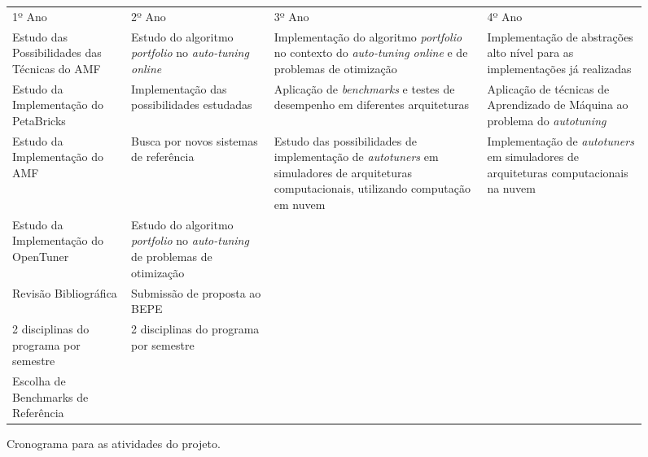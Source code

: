 \documentclass[a4paper, 12pt]{article}
\begin{document}
\begin{figure}[H]
    \centering
\begin{center}
    \begin{tabular}{ | >{\centering\arraybackslash}p{3.25cm} |
    >{\centering\arraybackslash}p{3.25cm} |
    >{\centering\arraybackslash}p{3.25cm} |
    >{\centering\arraybackslash}p{3.25cm} |}
    \multicolumn{4}{c}{} \\
    \hline
    1º Ano & 2º Ano & 3º Ano & 4º Ano \\ \hline
    \cellcolor{gray!96} Estudo das Possibilidades das Técnicas do AMF  & \cellcolor{gray!14} Estudo do algoritmo \emph{portfolio} no \emph{auto-tuning online} & \cellcolor{gray!96} Implementação do algoritmo \emph{portfolio} no contexto do \emph{auto-tuning online} e de problemas de otimização & \cellcolor{gray!14} Implementação de abstrações alto nível para as implementações já realizadas \\
    \cellcolor{gray!84} Estudo da Implementação do PetaBricks & \cellcolor{gray!28} Implementação das possibilidades estudadas & \cellcolor{gray!70} Aplicação de \emph{benchmarks} e testes de desempenho em diferentes arquiteturas & \cellcolor{gray!28} Aplicação de técnicas de Aprendizado de Máquina ao problema do \emph{autotuning} \\
    \cellcolor{gray!70} Estudo da Implementação do AMF & \cellcolor{gray!42} Busca por novos sistemas de referência & \cellcolor{gray!56} Estudo das possibilidades de implementação de \emph{autotuners} em simuladores de arquiteturas computacionais, utilizando computação em nuvem & \cellcolor{gray!42} Implementação de \emph{autotuners} em simuladores de arquiteturas computacionais na nuvem \\
    \cellcolor{gray!56} Estudo da Implementação do OpenTuner & \cellcolor{gray!70} Estudo do algoritmo \emph{portfolio} no \emph{auto-tuning} de problemas de otimização & \multicolumn{2}{l|}{} \\
    \cellcolor{gray!42} Revisão Bibliográfica &  \cellcolor{gray!84} Submissão de proposta ao BEPE & \multicolumn{2}{l|}{} \\
    \cellcolor{gray!28} 2 disciplinas do programa por semestre &  \cellcolor{gray!96} 2 disciplinas do programa por semestre & \multicolumn{2}{l|}{} \\
    \cellcolor{gray!14} Escolha de Benchmarks de Referência & \multicolumn{3}{l|}{} \\
    \hline
    \end{tabular}
\end{center}
    \caption{Cronograma para as atividades do projeto.}
    \label{fig:sched}
\end{figure}



\end{document}
